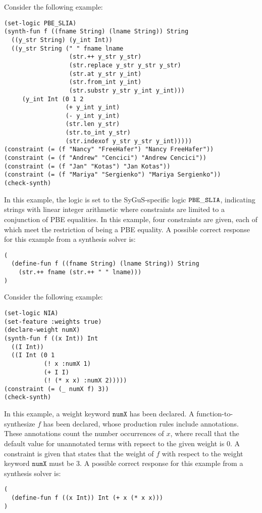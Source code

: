 \documentclass[english,a4paper,10pt]{article}
\begin{document}
\begin{example}
Consider the following example:
\begin{lstlisting}[language=SyGuS]
(set-logic PBE_SLIA)
(synth-fun f ((fname String) (lname String)) String
  ((y_str String) (y_int Int))
  ((y_str String (" " fname lname
                  (str.++ y_str y_str)
                  (str.replace y_str y_str y_str)
                  (str.at y_str y_int)
                  (str.from_int y_int)
                  (str.substr y_str y_int y_int)))
     (y_int Int (0 1 2
                 (+ y_int y_int)
                 (- y_int y_int)
                 (str.len y_str)
                 (str.to_int y_str)
                 (str.indexof y_str y_str y_int)))))
(constraint (= (f "Nancy" "FreeHafer") "Nancy FreeHafer"))
(constraint (= (f "Andrew" "Cencici") "Andrew Cencici"))
(constraint (= (f "Jan" "Kotas") "Jan Kotas"))
(constraint (= (f "Mariya" "Sergienko") "Mariya Sergienko"))
(check-synth)
\end{lstlisting}
In this example, the logic is set to the SyGuS-specific logic
${\tt PBE\_SLIA}$, indicating strings with linear integer arithmetic
where constraints are limited to a conjunction of PBE equalities.
In this example, four constraints are given, each of which meet the
restriction of being a PBE equality.
A possible correct response for this example from a synthesis solver is:
\begin{lstlisting}[language=SyGuS]
(
  (define-fun f ((fname String) (lname String)) String
    (str.++ fname (str.++ " " lname)))
)
\end{lstlisting}
\end{example}

\begin{example}[Weights]
Consider the following example:
\begin{lstlisting}[language=SyGuS]
(set-logic NIA)
(set-feature :weights true)
(declare-weight numX)
(synth-fun f ((x Int)) Int
  ((I Int))
  ((I Int (0 1
           (! x :numX 1)
           (+ I I)
           (! (* x x) :numX 2)))))
(constraint (= (_ numX f) 3))
(check-synth)
\end{lstlisting}
In this example, a weight keyword $\texttt{numX}$ has been declared.
A function-to-synthesize $f$ has been declared, whose production
rules include annotations.
These annotations count the number occurrences of $x$, where recall
that the default value for unannotated terms with repsect to the given weight is $0$.
A constraint is given that states that the weight of $f$ with respect to
the weight keyword $\texttt{numX}$ must be $3$.
A possible correct response for this example from a synthesis solver is:
\begin{lstlisting}[language=SyGuS]
(
  (define-fun f ((x Int)) Int (+ x (* x x)))
)
\end{lstlisting}
\end{example}
\end{document}
